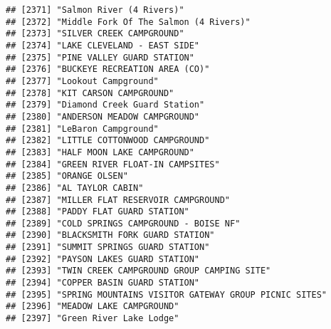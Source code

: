 \documentclass[
]{article}
\begin{document}
\begin{verbatim}
## [2371] "Salmon River (4 Rivers)"                                                             
## [2372] "Middle Fork Of The Salmon (4 Rivers)"                                                
## [2373] "SILVER CREEK CAMPGROUND"                                                             
## [2374] "LAKE CLEVELAND - EAST SIDE"                                                          
## [2375] "PINE VALLEY GUARD STATION"                                                           
## [2376] "BUCKEYE RECREATION AREA (CO)"                                                        
## [2377] "Lookout Campground"                                                                  
## [2378] "KIT CARSON CAMPGROUND"                                                               
## [2379] "Diamond Creek Guard Station"                                                         
## [2380] "ANDERSON MEADOW CAMPGROUND"                                                          
## [2381] "LeBaron Campground"                                                                  
## [2382] "LITTLE COTTONWOOD CAMPGROUND"                                                        
## [2383] "HALF MOON LAKE CAMPGROUND"                                                           
## [2384] "GREEN RIVER FLOAT-IN CAMPSITES"                                                      
## [2385] "ORANGE OLSEN"                                                                        
## [2386] "AL TAYLOR CABIN"                                                                     
## [2387] "MILLER FLAT RESERVOIR CAMPGROUND"                                                    
## [2388] "PADDY FLAT GUARD STATION"                                                            
## [2389] "COLD SPRINGS CAMPGROUND - BOISE NF"                                                  
## [2390] "BLACKSMITH FORK GUARD STATION"                                                       
## [2391] "SUMMIT SPRINGS GUARD STATION"                                                        
## [2392] "PAYSON LAKES GUARD STATION"                                                          
## [2393] "TWIN CREEK CAMPGROUND GROUP CAMPING SITE"                                            
## [2394] "COPPER BASIN GUARD STATION"                                                          
## [2395] "SPRING MOUNTAINS VISITOR GATEWAY GROUP PICNIC SITES"                                 
## [2396] "MEADOW LAKE CAMPGROUND"                                                              
## [2397] "Green River Lake Lodge"                                                              

\end{verbatim}
\end{document}
